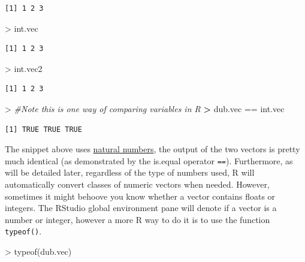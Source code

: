 \documentclass[
]{book}
\newenvironment{Shaded}{\begin{snugshade}}{\end{snugshade}}
\newcommand{\CommentTok}[1]{\textcolor[rgb]{0.56,0.35,0.01}{\textit{#1}}}
\newcommand{\ErrorTok}[1]{\textcolor[rgb]{0.64,0.00,0.00}{\textbf{#1}}}
\newcommand{\FunctionTok}[1]{\textcolor[rgb]{0.00,0.00,0.00}{#1}}
\newcommand{\NormalTok}[1]{#1}
\newcommand{\SpecialCharTok}[1]{\textcolor[rgb]{0.00,0.00,0.00}{#1}}
\theoremstyle{definition}
\theoremstyle{definition}
\theoremstyle{definition}
\theoremstyle{definition}
\theoremstyle{remark}
\begin{document}
\begin{verbatim}
[1] 1 2 3
\end{verbatim}

\begin{Shaded}
\begin{Highlighting}[]
\SpecialCharTok{\textgreater{}}\NormalTok{ int.vec}
\end{Highlighting}
\end{Shaded}

\begin{verbatim}
[1] 1 2 3
\end{verbatim}

\begin{Shaded}
\begin{Highlighting}[]
\SpecialCharTok{\textgreater{}}\NormalTok{ int.vec2}
\end{Highlighting}
\end{Shaded}

\begin{verbatim}
[1] 1 2 3
\end{verbatim}

\begin{Shaded}
\begin{Highlighting}[]
\SpecialCharTok{\textgreater{}} \CommentTok{\#Note this is one way of comparing variables in R}
\ErrorTok{\textgreater{}}\NormalTok{ dub.vec }\SpecialCharTok{==}\NormalTok{ int.vec}
\end{Highlighting}
\end{Shaded}

\begin{verbatim}
[1] TRUE TRUE TRUE
\end{verbatim}

The snippet above uses \href{https://en.wikipedia.org/wiki/Natural_number}{natural numbers}, the output of the two
vectors is pretty much identical (as demonstrated by the is.equal operator \texttt{==}). Furthermore, as will be detailed
later, regardless of the type of numbers used, R will automatically convert classes of numeric vectors when needed.
However, sometimes it might behoove you know whether a vector contains floats or integers. The RStudio global
environment pane will denote if a vector is a number or integer, however a more R way to do it is to use the function
\texttt{typeof()}.

\begin{Shaded}
\begin{Highlighting}[]
\SpecialCharTok{\textgreater{}} \FunctionTok{typeof}\NormalTok{(dub.vec)}
\end{Highlighting}
\end{Shaded}
\end{document}
